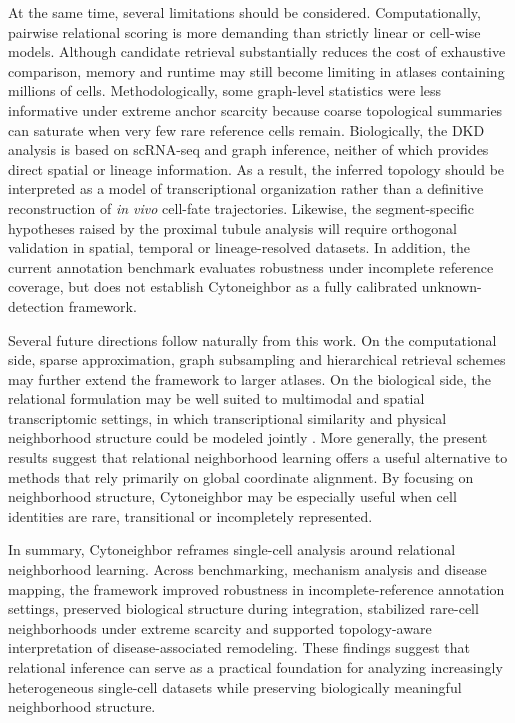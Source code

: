 \documentclass[11pt]{article}
\begin{document}
At the same time, several limitations should be considered. Computationally, pairwise relational scoring is more demanding than strictly linear or cell-wise models. Although candidate retrieval substantially reduces the cost of exhaustive comparison, memory and runtime may still become limiting in atlases containing millions of cells. Methodologically, some graph-level statistics were less informative under extreme anchor scarcity because coarse topological summaries can saturate when very few rare reference cells remain. Biologically, the DKD analysis is based on scRNA-seq and graph inference, neither of which provides direct spatial or lineage information. As a result, the inferred topology should be interpreted as a model of transcriptional organization rather than a definitive reconstruction of \textit{in vivo} cell-fate trajectories. Likewise, the segment-specific hypotheses raised by the proximal tubule analysis will require orthogonal validation in spatial, temporal or lineage-resolved datasets. In addition, the current annotation benchmark evaluates robustness under incomplete reference coverage, but does not establish Cytoneighbor as a fully calibrated unknown-detection framework.

Several future directions follow naturally from this work. On the computational side, sparse approximation, graph subsampling and hierarchical retrieval schemes may further extend the framework to larger atlases. On the biological side, the relational formulation may be well suited to multimodal and spatial transcriptomic settings, in which transcriptional similarity and physical neighborhood structure could be modeled jointly \cite{Heumos2023BestPractices,Hao2021Multimodal,Lake2023KidneyAtlas}. More generally, the present results suggest that relational neighborhood learning offers a useful alternative to methods that rely primarily on global coordinate alignment. By focusing on neighborhood structure, Cytoneighbor may be especially useful when cell identities are rare, transitional or incompletely represented.

In summary, Cytoneighbor reframes single-cell analysis around relational neighborhood learning. Across benchmarking, mechanism analysis and disease mapping, the framework improved robustness in incomplete-reference annotation settings, preserved biological structure during integration, stabilized rare-cell neighborhoods under extreme scarcity and supported topology-aware interpretation of disease-associated remodeling. These findings suggest that relational inference can serve as a practical foundation for analyzing increasingly heterogeneous single-cell datasets while preserving biologically meaningful neighborhood structure.
\end{document}
